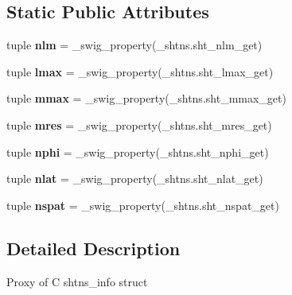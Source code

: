 \subsection*{Static Public Attributes}
\begin{DoxyCompactItemize}
\item 
\hypertarget{classshtns_1_1sht_a52d1010ce038efd2f52334962cbf0e42}{}tuple {\bfseries nlm} = \+\_\+swig\+\_\+property(\+\_\+shtns.\+sht\+\_\+nlm\+\_\+get)\label{classshtns_1_1sht_a52d1010ce038efd2f52334962cbf0e42}

\item 
\hypertarget{classshtns_1_1sht_a4692124b10796c5fbf76901a7e78d0be}{}tuple {\bfseries lmax} = \+\_\+swig\+\_\+property(\+\_\+shtns.\+sht\+\_\+lmax\+\_\+get)\label{classshtns_1_1sht_a4692124b10796c5fbf76901a7e78d0be}

\item 
\hypertarget{classshtns_1_1sht_a82e27e18d80035959539e48dc5ad062a}{}tuple {\bfseries mmax} = \+\_\+swig\+\_\+property(\+\_\+shtns.\+sht\+\_\+mmax\+\_\+get)\label{classshtns_1_1sht_a82e27e18d80035959539e48dc5ad062a}

\item 
\hypertarget{classshtns_1_1sht_a64c1e43ed773954e2f65b9f8b2a1a5c2}{}tuple {\bfseries mres} = \+\_\+swig\+\_\+property(\+\_\+shtns.\+sht\+\_\+mres\+\_\+get)\label{classshtns_1_1sht_a64c1e43ed773954e2f65b9f8b2a1a5c2}

\item 
\hypertarget{classshtns_1_1sht_ab25c18280944a906bfc484f25c087646}{}tuple {\bfseries nphi} = \+\_\+swig\+\_\+property(\+\_\+shtns.\+sht\+\_\+nphi\+\_\+get)\label{classshtns_1_1sht_ab25c18280944a906bfc484f25c087646}

\item 
\hypertarget{classshtns_1_1sht_afaa6c5f489fb5916153956b0bca9ab7b}{}tuple {\bfseries nlat} = \+\_\+swig\+\_\+property(\+\_\+shtns.\+sht\+\_\+nlat\+\_\+get)\label{classshtns_1_1sht_afaa6c5f489fb5916153956b0bca9ab7b}

\item 
\hypertarget{classshtns_1_1sht_a977720069fc64c0e378cc190ffe7eb86}{}tuple {\bfseries nspat} = \+\_\+swig\+\_\+property(\+\_\+shtns.\+sht\+\_\+nspat\+\_\+get)\label{classshtns_1_1sht_a977720069fc64c0e378cc190ffe7eb86}

\end{DoxyCompactItemize}


\subsection{Detailed Description}
\begin{DoxyVerb}Proxy of C shtns_info struct\end{DoxyVerb}
 

